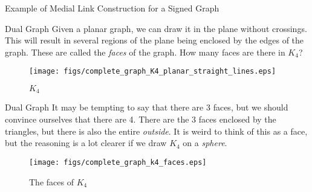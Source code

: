 \documentclass{beamer}
\begin{document}
\begin{frame}{Example of Medial Link Construction for a Signed Graph}
\begin{center}
\end{center}
\end{frame}
    \begin{frame}{Dual Graph}
        Given a planar graph, we can draw it in the plane without crossings.
        This will result in several regions of the plane being enclosed by
        the edges of the graph. These are called the \textit{faces} of the
        graph. How many faces are there in $K_{4}$?
        \begin{figure}
            \centering
            \texttt{[image: figs/complete\_graph\_K4\_planar\_straight\_lines.eps]}
            \caption{$K_{4}$}
            \label{fig:K_4}
        \end{figure}
    \end{frame}
    \begin{frame}{Dual Graph}
        It may be tempting to say that there are 3 faces, but we should convince
        ourselves that there are 4. There are the 3 faces enclosed by the triangles,
        but there is also the entire \textit{outside}. It is weird to think of this
        as a face, but the reasoning is a lot clearer if we draw $K_{4}$ on a
        \textit{sphere}.
        \begin{figure}
            \centering
            \texttt{[image: figs/complete\_graph\_k4\_faces.eps]}
            \caption{The faces of $K_{4}$}
            \label{fig:k4_faces}
        \end{figure}
    \end{frame}
\end{document}
